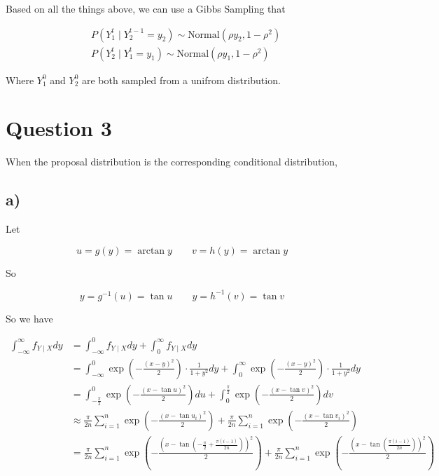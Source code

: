 \documentclass[12pt]{article}
\begin{document}
\begin{flushleft}
\qquad Based on all the things above, we can use a Gibbs Sampling that

\vspace{-0.5cm}

\begin{align*}
&P(Y_1^{t} \mid Y_2^{t-1} = y_2) \sim \text{Normal}(\rho y_2, 1-\rho^2)\\
&P(Y_2^{t} \mid Y_1^{t} = y_1) \sim \text{Normal}(\rho y_1, 1-\rho^2)
\end{align*}

\qquad Where $Y_1^{0}$ and $Y_2^{0}$ are both sampled from a unifrom distribution.

\section{Question 3}

\qquad When the proposal distribution is the corresponding conditional distribution, 


\newpage

























\subsection*{a)}

\qquad Let 

$$
u = g(y) = \arctan y \qquad v = h(y) = \arctan y
$$

\qquad So 

$$
y = g^{-1}(u) = \tan u \qquad y = h^{-1}(v) = \tan v
$$

\qquad So we have

\vspace{-0.5cm}

\begin{align*}
\int_{-\infty}^{\infty}f_{Y\mid X} dy &= \int_{-\infty}^{0} f_{Y\mid X}dy + \int_{0}^{\infty} f_{Y\mid X}dy\\
&= \int_{-\infty}^{0} \exp(-\frac{(x-y)^2}{2})\cdot \frac{1}{1+y^2}dy + \int_{0}^{\infty} \exp(-\frac{(x-y)^2}{2})\cdot \frac{1}{1+y^2}dy\\
&= \int_{-\frac{\pi}{2}}^0 \exp(-\frac{(x-\tan u)^2}{2}) du + \int_{0}^{\frac{\pi}{2}} \exp(-\frac{(x-\tan v)^2}{2}) dv\\
&\approx \frac{\pi}{2n}\sum_{i=1}^n \exp(-\frac{(x - \tan u_i)^2}{2}) + \frac{\pi}{2n}\sum_{i=1}^n \exp(-\frac{(x - \tan v_i)^2}{2})\\
&= \frac{\pi}{2n} \sum_{i=1}^{n} \exp(-\frac{(x-\tan(-\frac{\pi}{2} + \frac{\pi (i-1)}{2n}))^2 }{2}) + \frac{\pi}{2n} \sum_{i=1}^{n} \exp(-\frac{(x-\tan(\frac{\pi (i-1)}{2n}))^2 }{2})
\end{align*}


\end{flushleft}
\end{document}
